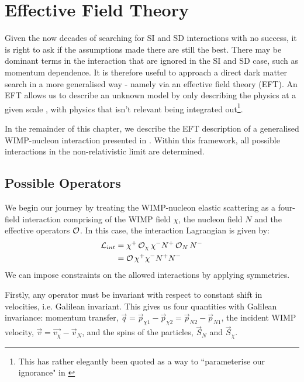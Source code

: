 \section{Effective Field Theory} \label{sec:eft_theory}

\par
Given the now decades of searching for SI and SD interactions with no success, it is right to ask if the assumptions made there are still the best.
There may be dominant terms in the interaction that are ignored in the SI and SD case, such as momentum dependence.
It is therefore useful to approach a direct dark matter search in a more generalised way - namely via an effective field theory (EFT).
An EFT allows us to describe an unknown model by only describing the physics at a given scale \cite{eft_expo_ref}, with physics that isn't relevant being integrated out\footnote{This has rather elegantly been quoted as a way to ``parameterise our ignorance" in \cite{shaunalsum_thesis_ref}}.

\par
In the remainder of this chapter, we describe the EFT description of a generalised WIMP-nucleon interaction presented in \cite{Fitzpatrick_2013_ref}.
Within this framework, all possible interactions in the non-relativistic limit are determined.

\subsection{Possible Operators}

\par
We begin our journey by treating the WIMP-nucleon elastic scattering as a four-field interaction comprising of the WIMP field $\chi$, the nucleon field $N$ and the effective operators $\operatorname{\mathcal{O}}$.
In this case, the interaction Lagrangian is given by:
\begin{align}
\begin{split}
    \operatorname{\mathcal{L}}_{int} &= \chi^{+} \operatorname{\mathcal{O}}_{\chi} \chi^{-} N^{+} \operatorname{\mathcal{O}}_{N} N^{-} \\
                      &= \operatorname{\mathcal{O}} \chi^{+}\chi^{-} N^{+}N^{-}
\end{split}
\label{eq:eft_initial_lagrangian}
\end{align}
We can impose constraints on the allowed interactions by applying symmetries. 
\par
Firstly, any operator must be invariant with respect to constant shift in velocities, i.e. Galilean invariant.
This gives us four quantities with Galilean invariance: momentum transfer, $\vec{q} = \vec{p}_{\chi 1} - \vec{p}_{\chi 2} = \vec{p}_{N 2} - \vec{p}_{N 1}$, the incident WIMP velocity, $\vec{v}=\vec{v_\chi} - \vec{v}_N$, and the spins of the particles, $\vec{S}_N$ and $\vec{S}_\chi$.


